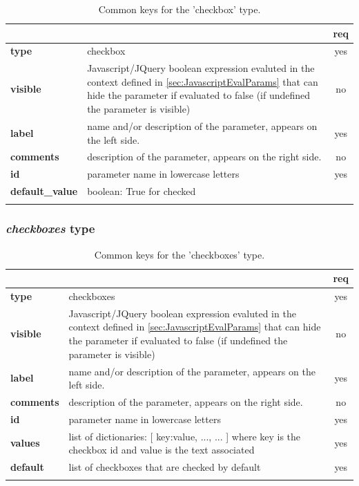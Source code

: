 \begin{longtable}{|>{\bf}L{\linewidth}|L{\linewidth}|c|}
\hline
      &  & {\bf req} 
\tabularnewline \hline \hline
 type  & checkbox  & yes \\ \hline
 visible  & Javascript/JQuery boolean expression evaluted in the context defined 
              in \ref{sec:JavascriptEvalParams} that can hide the parameter if
            evaluated to false (if undefined the parameter is visible)& no \\ \hline
 label  & name and/or description of the parameter, appears on the left side. & yes
                      \\ \hline
 comments & description of the parameter, appears on the right side. & no
                      \\ \hline
 id         & parameter name in lowercase letters  & yes \\ \hline
 default\_value & boolean: True for checked & \\ \hline
\caption{Common keys for the 'checkbox' type.}
\end{longtable}

\subsubsection{ \emph{checkboxes} type}

\begin{longtable}{|>{\bf}L{\linewidth}|L{\linewidth}|c|}
\hline
      &  & {\bf req} 
\tabularnewline \hline \hline
 type  & checkboxes   & yes \\ \hline
 visible  & Javascript/JQuery boolean expression evaluted in the context defined 
              in \ref{sec:JavascriptEvalParams} that can hide the parameter if
            evaluated to false (if undefined the parameter is visible)& no \\ \hline
 label  & name and/or description of the parameter, appears on the left side. & yes
                      \\ \hline
 comments & description of the parameter, appears on the right side. & no
                      \\ \hline
 id         & parameter name in lowercase letters  & yes \\ \hline
 values     & list of dictionaries: [ {key:value, ...}, ... ]
            where key is the checkbox id and value is the text associated
            & yes \\ \hline
 default     & list of checkboxes that are checked by default  & yes \\ \hline
\caption{Common keys for the 'checkboxes' type.}
\end{longtable}


